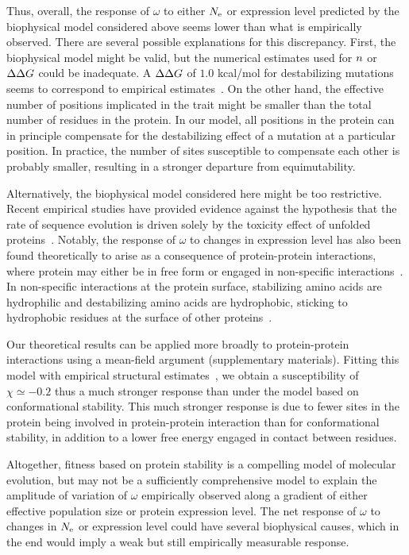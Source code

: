 \documentclass[authoryear]{elsarticle} %
\begin{document}
Thus, overall, the response of $\omega$ to either $N_{\text{e}}$ or expression level predicted by the biophysical model considered above seems lower than what is empirically observed.
There are several possible explanations for this discrepancy.
First, the biophysical model might be valid, but the numerical estimates used for $n$ or $\Delta \Delta G$ could be inadequate.
A $\Delta \Delta G$ of $1.0$ kcal/mol for destabilizing mutations seems to correspond to empirical estimates~\citep{Zeldovich2007}.
On the other hand, the effective number of positions implicated in the trait might be smaller than the total number of residues in the protein.
In our model, all positions in the protein can in principle compensate for the destabilizing effect of a mutation at a particular position.
In practice, the number of sites susceptible to compensate each other is probably smaller, resulting in a stronger departure from equimutability.

Alternatively, the biophysical model considered here might be too restrictive.
Recent empirical studies have provided evidence against the hypothesis that the rate of sequence evolution is driven solely by the toxicity effect of unfolded proteins~\citep{Plata2017,Razban2019,Biesiadecka2020}.
Notably, the response of $\omega$ to changes in expression level has also been found theoretically to arise as a consequence of protein-protein interactions, where protein may either be in free form or engaged in non-specific interactions~\citep{Yang2012, Zhang2013}.
In non-specific interactions at the protein surface, stabilizing amino acids are hydrophilic and destabilizing amino acids are hydrophobic, sticking to hydrophobic residues at the surface of other proteins~\citep{Dixit2013,Manhart2015}.

Our theoretical results can be applied more broadly to protein-protein interactions using a mean-field argument (supplementary materials).
Fitting this model with empirical structural estimates~\citep{Janin1995a, Zhang2008}, we obtain a susceptibility of $\chi \simeq -0.2$ thus a much stronger response than under the model based on conformational stability.
This much stronger response is due to fewer sites in the protein being involved in protein-protein interaction than for conformational stability, in addition to a lower free energy engaged in contact between residues.

Altogether, fitness based on protein stability is a compelling model of molecular evolution, but may not be a sufficiently comprehensive model to explain the amplitude of variation of $\omega$ empirically observed along a gradient of either {effective population size} or protein expression level.
The net response of $\omega$ to changes in $N_{\text{e}}$ or expression level could have several biophysical causes, which in the end would imply a weak but still empirically measurable response.
\end{document}
